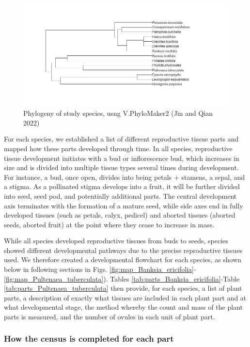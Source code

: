 \documentclass[10pt,twoside]{article}\usepackage[]{graphicx}\usepackage[]{color}
\begin{document}
\begin{figure}[h]
\centering
\includegraphics[width=\linewidth]{phylogeny.jpeg}
\caption{Phylogeny of study species, usng V.PhyloMaker2 (Jin and Qian 2022)}
\label{fig:phylogeny}
\end{figure}
\clearpage


For each species, we established a list of different reproductive tissue parts and mapped how these parts developed through time. In all species, reproductive tissue development initiates with a bud or inflorescence bud, which increases in size and is divided into multiple tissue types several times during development. For instance, a bud, once open, divides into being petals + stamens, a sepal, and a stigma. As a pollinated stigma develops into a fruit, it will be further divided into seed, seed pod, and potentially additional parts. The central development axis terminates with the formation of a mature seed, while side axes end in fully developed tissues (such as petals, calyx, pedicel) and aborted tissues (aborted seeds, aborted fruit) at the point where they cease to increase in mass.

While all species developed reproductive tissues from buds to seeds, species showed different developmental pathways due to the precise reproductive tissues used. We therefore created a developmental flowchart for each species, as shown below in following sections in Figs. \ref{fig:map_Banksia_ericifolia}-\ref{fig:map_Pultenaea_tuberculata}). Tables \ref{tab:parts_Banksia_ericifolia}-Table \ref{tab:parts_Pultenaea_tuberculata} then provide, for each species, a list of plant parts, a description of exactly what tissues are included in each plant part and at what developmental stage, the method whereby the count and mass of the plant parts is measured, and the number of ovules in each unit of plant part.

\subsubsection{How the census is completed for each part}
\end{document}
